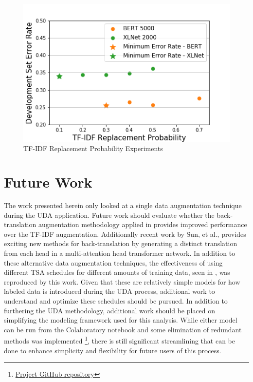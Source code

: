 \documentclass[twoside,twocolumn,10pt]{article}
\begin{document}
\begin{figure}
	\includegraphics[width=\linewidth]{tfidf.png}
	\caption{TF-IDF Replacement Probability Experiments}
	\label{fig:tfidf}
\end{figure}

\section{Future Work} \label{future}
The work presented herein only looked at a single data augmentation technique during the UDA application. Future work should evaluate whether the back-translation augmentation methodology applied in \cite{Xie:2019} provides improved performance over the TF-IDF augmentation. Additionally recent work by Sun, et al., \cite{Sun:2019} provides exciting new methods for back-translation by generating a distinct translation from each head in a multi-attention head transformer network. In addition to these alternative data augmentation techniques, the effectiveness of using different TSA schedules for different amounts of training data, seen in \cite{Xie:2019}, was reproduced by this work. Given that these are relatively simple models for how labeled data is introduced during the UDA process, additional work to understand and optimize these schedules should be pursued. In addition to furthering the UDA methodology, additional work should be placed on simplifying the modeling framework used for this analysis. While either model can be run from the Colaboratory notebook and some elimination of redundant methods was implemented \footnote{ \href{https://github.com/tomgoter/nlp_finalproject}{Project GitHub repository}}, there is still significant streamlining that can be done to enhance simplicity and flexibility for future users of this process.
\end{document}
